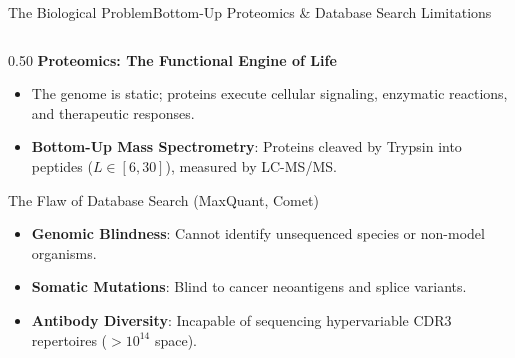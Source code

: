 \documentclass[aspectratio=169, 10pt]{beamer}
\begin{document}
\begin{frame}{The Biological Problem}{Bottom-Up Proteomics \& Database Search Limitations}
\begin{columns}[T]
\begin{column}{0.50\textwidth}
  \textbf{\footnotesize Proteomics: The Functional Engine of Life}
  \begin{itemize}\setlength{\itemsep}{2pt}\scriptsize
    \item The genome is static; proteins execute cellular signaling, enzymatic reactions, and therapeutic responses.
    \item \textbf{Bottom-Up Mass Spectrometry}: Proteins cleaved by Trypsin into peptides ($L \in [6, 30]$), measured by LC-MS/MS.
  \end{itemize}
  \vspace{0.1cm}
  \begin{alertblock}{\scriptsize The Flaw of Database Search (MaxQuant, Comet)}
    \begin{itemize}\setlength{\itemsep}{1pt}\scriptsize
      \item \textbf{Genomic Blindness}: Cannot identify unsequenced species or non-model organisms.
      \item \textbf{Somatic Mutations}: Blind to cancer neoantigens and splice variants.
      \item \textbf{Antibody Diversity}: Incapable of sequencing hypervariable CDR3 repertoires ($>10^{14}$ space).
    \end{itemize}
  \end{alertblock}
\end{column}


\end{columns}
\end{frame}
\end{document}

